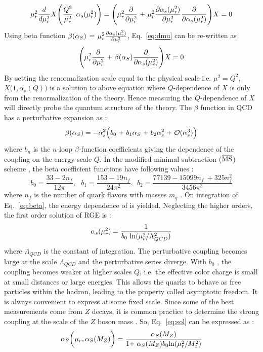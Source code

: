 \begin{equation}
\mur^{2}\frac{d}{d\mur^{2}}X\Bigg(\frac{Q^{2}}{\mur^{2}},\alpha_{s}(\mur^{2})\Bigg)=
\Bigg(\mur^{2}\frac{\partial}{\partial\mur^{2}}~\plus \mur^{2}\frac{\partial\alpha_{s}(\mur^{2})}
{\partial\mur^{2}}\frac{\partial}{\partial\alpha_{s}(\mur^{2})}\Bigg)X=0
\label{eq:dmu}
\end{equation}
Using beta function $\beta(\alpha_S)$ = $\mur^{2}\frac{\partial\alpha_{s}(\mur^{2})}{\partial\mur^{2}}$, Eq.~\ref{eq:dmu} can be re-written as 
\begin{equation}
\Bigg(\mur^{2}\frac{\partial}{\partial\mur^{2}}~\plus \beta(\alps)\frac{\partial}{\partial\alpha_{s}(\mur^{2})}\Bigg)X=0
\label{eq:dmu2}
\end{equation}
By setting the renormalization scale equal to the physical scale i.e. $\mu^{2}=Q^{2}$, $X\big(1,\alpha_{s}(Q)\big)$ is a solution to above equation where $Q$-dependence of $X$ is only from the renormalization of the theory. Hence measuring the $Q$-dependence of $X$ will directly probe the quantum structure of the theory. The $\beta$ function in QCD has a perturbative expansion as : 
\begin{equation}
\beta(\alps)=-\alpha_{s}^{2}\Big(b_0~\plus b_1\alps~\plus b_2\alpha_{s}^{2}~\plus {\cal O}(\alpha_{s}^{3})\Big) 
\label{eq:beta}
\end{equation}
where $b_n$ is the $n$-loop $\beta$-function coefficients giving the dependence of the coupling on the energy scale $Q$. In the modified minimal subtraction ($\overline{\rm MS}$) scheme \cite{tHooft:1973mfk,Weinberg:1951ss}, the beta coefficient functions have following values :
\begin{equation}
b_0 = \frac{33-2n_f}{12\pi}, ~~~b_1 = \frac{153-19n_f}{24\pi^2}, ~~b_2 = \frac{77139 - 15099n_f~\plus 325n^2_f}{3456\pi^3}
\end{equation}
where $n_f$ is the number of quark flavors with masses $m_q$ \ls \mur. On integration of Eq.~\ref{eq:beta}, the energy dependence of \alps is yielded. Neglecting the higher orders, the first order solution of RGE is :
\begin{equation}
\alpha_{s}(\mur^2)=\frac{1}{b_0~{\rm ln}(\mur^2/\Lambda^2_{QCD})}
\label{eq:sol}
\end{equation}
where $\Lambda_{QCD}$ is the constant of integration. The perturbative coupling becomes large at the scale $\Lambda_{QCD}$ and the perturbative series diverge. With $b_0$ , the coupling becomes weaker at higher scales $Q$, i.e. the effective color charge is small at small distances or large energies. This allows the quarks to behave as free particles within the hadron, leading to the property called asymptotic freedom. It is always convenient to express \alps at some fixed scale. Since some of the best measurements come from $Z$ decays, it is common practice to determine the strong coupling at the scale of the $Z$ boson mass \alpsmz. So, Eq.~\ref{eq:sol} can be expressed as :
\begin{equation}
\alps\bigg(\mur,\alpsmz\bigg) = \frac{\alpsmz}{1\plus\alpsmz b_0{\rm ln}(\mur^2/M^2_z)}
\end{equation}

